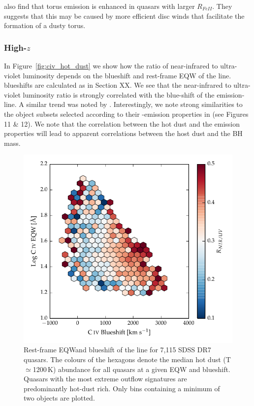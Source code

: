 \citet{shen14} also find that torus emission is enhanced in quasars with larger $R_{FeII}$.
They suggests that this may be caused by more efficient disc winds that facilitate the formation of a dusty torus. 

\subsubsection{High-$z$}

In Figure~\ref{fig:civ_hot_dust} we show how the ratio of near-infrared to ultra-violet luminosity depends on the blueshift and rest-frame EQW of the  line.
 blueshifts are calculated as in Section XX. 
We see that the near-infrared to ultra-violet luminosity ratio is strongly correlated with the blue-shift of the  emission-line. 
A similar trend was noted by \citet{wang13}. 
Interestingly, we note strong similarities to the object subsets selected according to their -emission properties in \citet{richards11} (see Figures 11 \& 12).  
We note that the correlation between the hot dust and the  emission properties will lead to apparent correlations between the host dust and the BH mass. 
 
\begin{figure}
\centering
  \includegraphics[width=\columnwidth]{figures/chapter05/hot_dust_beta.pdf}
\caption[{Hot dust abundance as a function of rest-frame EQW and blueshift of the  line.}]{Rest-frame EQWand blueshift of the  line for 7,115 SDSS DR7 quasars. The colours of the hexagons denote the median hot dust (T$\simeq$1200\,K) abundance for all quasars at a given EQW and blueshift. Quasars with the most extreme outflow signatures are predominantly hot-dust rich. Only bins containing a minimum of two objects are plotted. }
  \label{fig:hot_dust_beta}
\end{figure}

